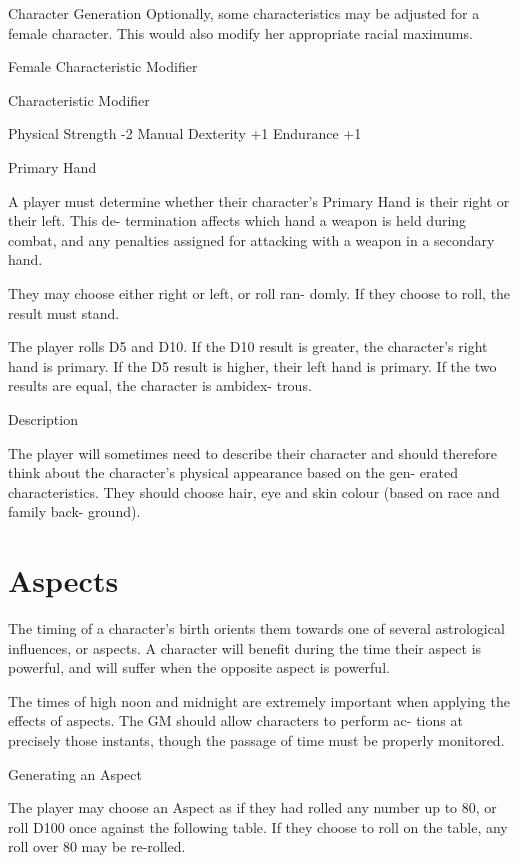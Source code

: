\begin{Chapter}{Character Generation}
Optionally,  some  characteristics  may  be  adjusted 
for a female character. This would also modify her 
appropriate racial maximums. 

Female Characteristic Modifier 

Characteristic   Modifier 

Physical Strength  
-2 
Manual Dexterity   +1 
Endurance  
+1 

Primary Hand 

A  player  must  determine  whether  their  character’s 
Primary  Hand  is  their  right  or  their  left.  This  de-
termination  affects  which  hand  a  weapon  is  held 
during  combat,  and  any  penalties  assigned  for 
attacking with a weapon in a secondary hand. 

They  may  choose  either  right  or  left,  or  roll  ran-
domly. If they choose to roll, the result must stand. 

The  player  rolls  D5  and  D10.  If  the  D10  result  is 
greater, the character’s right hand is primary. If the 
D5 result is higher, their left hand is primary. If the 
two  results  are  equal,  the  character  is  ambidex-
trous. 

Description 

The  player  will  sometimes  need  to  describe  their 
character  and  should  therefore  think  about  the 
character’s  physical  appearance  based  on  the  gen-
erated characteristics. They should choose hair, eye 
and  skin  colour  (based  on  race  and  family  back-
ground). 

\section{Aspects}
\label{aspects}

The timing of a character’s birth orients them towards one of several
astrological influences, or aspects.  A character will benefit during
the time their aspect is powerful, and will suffer when the opposite
aspect is powerful.

The times of high noon and midnight are extremely 
important  when  applying  the  effects  of  aspects. 
The  GM  should  allow  characters  to  perform  ac-
tions at precisely those instants, though the passage 
of time must be properly monitored. 

Generating an Aspect 

The  player  may  choose  an  Aspect  as  if  they  had 
rolled  any  number  up  to  80,  or  roll  D100  once 
against  the  following  table.  If  they  choose  to  roll 
on the table, any roll over 80 may be re-rolled. 


\end{Chapter}
